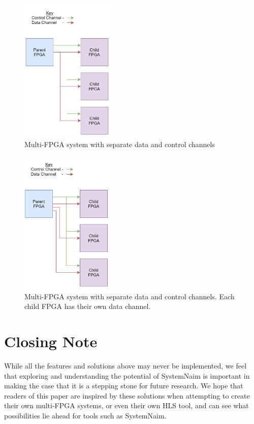\begin{figure}[!htb]
    \centering
    \includegraphics[width=0.4\textwidth]{06_future_work/images/data_control_channels.png}
    \caption{Multi-FPGA system with separate data and control channels}
    \label{fig:data_control}
\end{figure}

\begin{figure}[!htb]
    \centering
    \includegraphics[width=0.4\textwidth]{06_future_work/images/data_control_channels_independent.png}
    \caption{Multi-FPGA system with separate data and control channels. Each child FPGA has their own data channel.}
    \label{fig:data_control_ind}
\end{figure}

\section{Closing Note}

While all the features and solutions above may never be implemented, we feel that exploring and understanding the potential of SystemNaim is important in making the case that it is a stepping stone for future research. We hope that readers of this paper are inspired by these solutions when attempting to create their own multi-FPGA systems, or even their own HLS tool, and can see what possibilities lie ahead for tools such as SystemNaim.